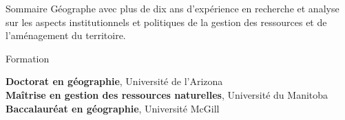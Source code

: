 \documentclass[9pt, letterpage]{resume} %
\begin{document}

\begin{rSection}{Sommaire} 
Géographe avec plus de dix ans d’expérience en recherche et analyse sur les aspects institutionnels et politiques de la gestion des ressources et de l’aménagement du territoire.
\end{rSection}


\begin{rSection}{Formation} 

\textbf{Doctorat en géographie}, Université de l'Arizona \\ 
\textbf{Maîtrise en gestion des ressources naturelles}, Université du Manitoba \\ 
\textbf{Baccalauréat en géographie}, Université McGill
\end{rSection}
\end{document}
